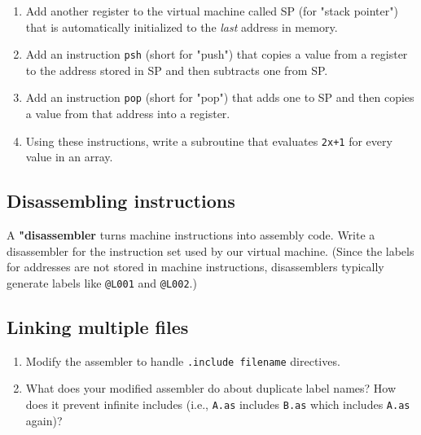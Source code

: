 \documentclass{scrbook}
\newcommand{\glossref}[1]{\textbf{#1}}
\begin{document}
\begin{enumerate}

\item 

Add another register to the virtual machine called SP (for "stack pointer")
    that is automatically initialized to the \emph{last} address in memory.



\item 

Add an instruction \texttt{psh} (short for "push") that copies a value from a register
    to the address stored in SP and then subtracts one from SP.



\item 

Add an instruction \texttt{pop} (short for "pop") that adds one to SP
    and then copies a value from that address into a register.



\item 

Using these instructions,
    write a subroutine that evaluates \texttt{2x+1} for every value in an array.



\end{enumerate}

\subsection*{Disassembling instructions}


A \glossref{"disassembler} turns machine instructions into assembly code.
Write a disassembler for the instruction set used by our virtual machine.
(Since the labels for addresses are not stored in machine instructions,
disassemblers typically generate labels like \texttt{@L001} and \texttt{@L002}.)

\subsection*{Linking multiple files}

\begin{enumerate}

\item 

Modify the assembler to handle \texttt{.include filename} directives.



\item 

What does your modified assembler do about duplicate label names?
    How does it prevent infinite includes
    (i.e., \texttt{A.as} includes \texttt{B.as} which includes \texttt{A.as} again)?



\end{enumerate}
\end{document}
